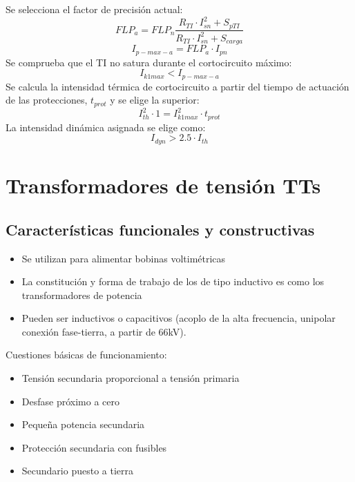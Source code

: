 Se selecciona el factor de precisión actual:
\begin{equation}
	FLP_a=FLP_n\dfrac{R_{TI}\cdot I^2_{sn}+S_{pTI}}{R_{TI}\cdot I^2_{sn}+S_{carga}}
\end{equation}
\begin{equation}
	I_{p-max-a}=FLP_a\cdot I_{pn}
\end{equation}
Se comprueba que el TI no satura durante el cortocircuito máximo:
\begin{equation}
	I_{k1max}<I_{p-max-a}
\end{equation}
Se calcula la intensidad térmica de cortocircuito a partir del tiempo de actuación de las protecciones, $ t_{prot}$ y se elige la superior:
\begin{equation}
	I^2_{th}\cdot 1 = I_{k1max}^2\cdot t_{prot}
\end{equation}
La intensidad dinámica asignada se elige como:
\begin{equation}
	I_{dyn}>2.5\cdot I_{th}
\end{equation}
\section{Transformadores de tensión TTs}
\subsection{Características funcionales y constructivas}
\begin{itemize}
	\item Se utilizan para alimentar bobinas voltimétricas
	\item La constitución y forma de trabajo de los de tipo inductivo es como los transformadores de potencia
	\item Pueden ser inductivos o capacitivos (acoplo de la alta frecuencia, unipolar conexión fase-tierra, a partir de 66kV).
\end{itemize}

Cuestiones básicas de funcionamiento:
\begin{itemize}
	\item Tensión secundaria proporcional a tensión primaria
	\item Desfase próximo a cero
	\item Pequeña potencia secundaria
	\item Protección secundaria con fusibles
	\item Secundario puesto a tierra
\end{itemize}


